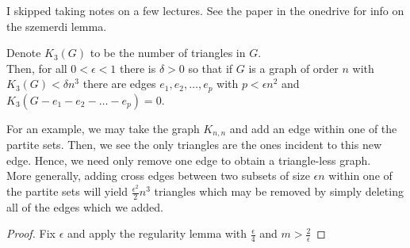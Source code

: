 \begin{note}{}
I skipped taking notes on a few lectures. See the paper in the onedrive for info on the szemerdi lemma.
\end{note}
\begin{lemma}
	Denote \(K_{3} \left( G \right) \) 	to be the number of triangles in \(G\).\\
	Then, for all \(0 < \epsilon < 1\) there is \(\delta > 0\) so that if \(G\) is a graph of order \(n\) with \(K_{3} \left( G \right) < \delta n^3\) there are edges \(e_1, e_2, \ldots ,e_{p}\) with \(p < \epsilon n^2\) and \(K_{3} \left( G - e_1 -e_2 - \ldots -e_{p} \right) = 0\).
\end{lemma}
For an example, we may take the graph \(K_{n, n} \) and add an edge within one of the partite sets. Then, we see the only triangles are the ones incident to this new edge. Hence, we need only remove one edge to obtain a triangle-less graph.\\
More generally, adding cross edges between two subsets of size \(\epsilon n\) within one of the partite sets will yield \(\frac{\epsilon^2}{2}n^3\) triangles which may be removed by simply deleting all of the edges which we added.

\begin{proof}
Fix \(\epsilon\) and apply the regularity lemma with \(\frac{\epsilon}{4}\) and \(m > \frac{2}{\epsilon}\)
\end{proof}
